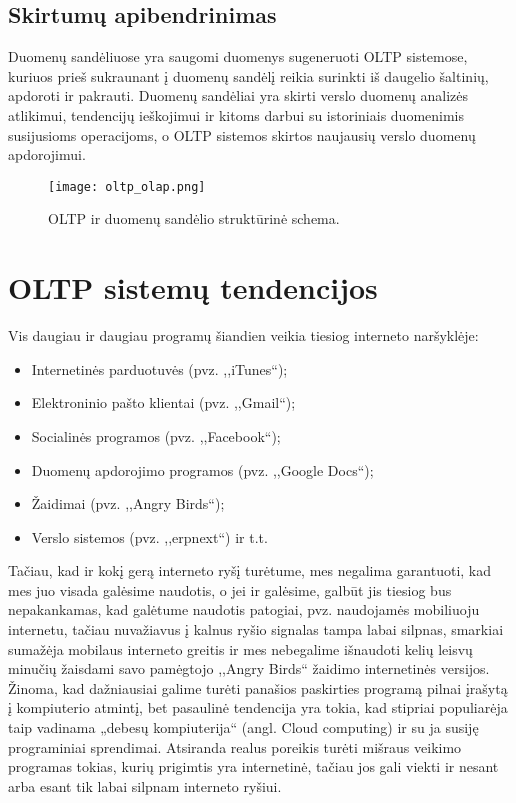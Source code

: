 \documentclass[12pt,a4paper,titlepage]{article}
\begin{document}
\subsection{Skirtumų apibendrinimas}

Duomenų sandėliuose yra saugomi duomenys sugeneruoti OLTP sistemose, kuriuos prieš sukraunant į duomenų sandėlį reikia surinkti iš daugelio šaltinių, apdoroti ir pakrauti. Duomenų sandėliai yra skirti verslo duomenų analizės atlikimui, tendencijų ieškojimui ir kitoms darbui su istoriniais duomenimis susijusioms operacijoms, o OLTP sistemos skirtos naujausių verslo duomenų apdorojimui.

\begin{figure}[htb]
\begin{center}
\leavevmode
\texttt{[image: oltp\_olap.png]}
\end{center}
\caption{OLTP ir duomenų sandėlio struktūrinė schema.}
\label{fig:oltp_olap}
\end{figure}

\newpage

\section{OLTP sistemų tendencijos}

Vis daugiau ir daugiau programų šiandien veikia tiesiog interneto naršyklėje:
\begin{itemize}
  \item Internetinės parduotuvės (pvz. ,,iTunes``);
  \item Elektroninio pašto klientai (pvz. ,,Gmail``);
  \item Socialinės programos (pvz. ,,Facebook``);
  \item Duomenų apdorojimo programos (pvz. ,,Google Docs``);
  \item Žaidimai (pvz. ,,Angry Birds``);
  \item Verslo sistemos (pvz. ,,erpnext``) ir t.t.
\end{itemize}

Tačiau, kad ir kokį gerą interneto ryšį turėtume, mes negalima garantuoti, kad mes juo visada galėsime naudotis, o jei ir galėsime, galbūt jis tiesiog bus nepakankamas, kad galėtume naudotis patogiai, pvz. naudojamės mobiliuoju internetu, tačiau nuvažiavus į kalnus ryšio signalas tampa labai silpnas, smarkiai sumažėja mobilaus interneto greitis ir mes nebegalime išnaudoti kelių leisvų minučių žaisdami savo pamėgtojo ,,Angry Birds`` žaidimo internetinės versijos. Žinoma, kad dažniausiai galime turėti panašios paskirties programą pilnai įrašytą į kompiuterio atmintį, bet pasaulinė tendencija yra tokia, kad stipriai populiarėja taip vadinama „debesų kompiuterija“ (angl. Cloud computing) ir su ja susiję programiniai sprendimai. Atsiranda realus poreikis turėti mišraus veikimo programas tokias, kurių prigimtis yra internetinė, tačiau jos gali viekti ir nesant arba esant tik labai silpnam interneto ryšiui. 
\end{document}
